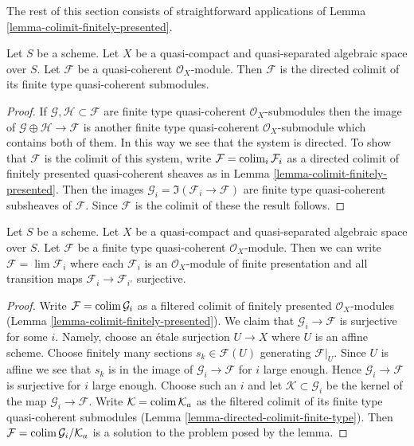 \noindent
The rest of this section consists of straightforward
applications of Lemma \ref{lemma-colimit-finitely-presented}.

\begin{lemma}
\label{lemma-directed-colimit-finite-type}
Let $S$ be a scheme. Let $X$ be a quasi-compact and quasi-separated
algebraic space over $S$.
Let $\mathcal{F}$ be a quasi-coherent $\mathcal{O}_X$-module.
Then $\mathcal{F}$ is the directed colimit of its finite type
quasi-coherent submodules.
\end{lemma}

\begin{proof}
If $\mathcal{G}, \mathcal{H} \subset \mathcal{F}$ are finite type
quasi-coherent $\mathcal{O}_X$-submodules then the image
of $\mathcal{G} \oplus \mathcal{H} \to \mathcal{F}$ is another
finite type quasi-coherent $\mathcal{O}_X$-submodule which contains
both of them. In this way we see that the system is directed.
To show that $\mathcal{F}$ is the colimit of this system, write
$\mathcal{F} = \mathop{\mathrm{colim}}\nolimits_i \mathcal{F}_i$ as a directed
colimit of finitely presented quasi-coherent sheaves as in
Lemma \ref{lemma-colimit-finitely-presented}.
Then the images $\mathcal{G}_i = \Im(\mathcal{F}_i \to \mathcal{F})$ are
finite type quasi-coherent subsheaves of $\mathcal{F}$. Since
$\mathcal{F}$ is the colimit of these the result follows.
\end{proof}

\begin{lemma}
\label{lemma-finite-directed-colimit-surjective-maps}
Let $S$ be a scheme. Let $X$ be a quasi-compact and quasi-separated
algebraic space over $S$. Let $\mathcal{F}$ be a finite type
quasi-coherent $\mathcal{O}_X$-module. Then we can write
$\mathcal{F} = \lim \mathcal{F}_i$ where each $\mathcal{F}_i$ is an
$\mathcal{O}_X$-module of finite presentation and all transition maps
$\mathcal{F}_i \to \mathcal{F}_{i'}$ surjective.
\end{lemma}

\begin{proof}
Write $\mathcal{F} = \mathop{\mathrm{colim}}\nolimits \mathcal{G}_i$ as a filtered colimit of
finitely presented $\mathcal{O}_X$-modules
(Lemma \ref{lemma-colimit-finitely-presented}).
We claim that $\mathcal{G}_i \to \mathcal{F}$ is surjective for some $i$.
Namely, choose an \'etale surjection $U \to X$ where $U$ is an affine scheme.
Choose finitely many sections $s_k \in \mathcal{F}(U)$ generating
$\mathcal{F}|_U$. Since $U$ is affine we see that $s_k$ is in the image
of $\mathcal{G}_i \to \mathcal{F}$ for $i$ large enough. Hence
$\mathcal{G}_i \to \mathcal{F}$ is surjective for $i$ large enough.
Choose such an $i$ and let $\mathcal{K} \subset \mathcal{G}_i$ be the
kernel of the map $\mathcal{G}_i \to \mathcal{F}$. Write
$\mathcal{K} = \mathop{\mathrm{colim}}\nolimits \mathcal{K}_a$
as the filtered colimit of its finite type quasi-coherent submodules
(Lemma \ref{lemma-directed-colimit-finite-type}). Then
$\mathcal{F} = \mathop{\mathrm{colim}}\nolimits \mathcal{G}_i/\mathcal{K}_a$ is a solution
to the problem posed by the lemma.
\end{proof}

